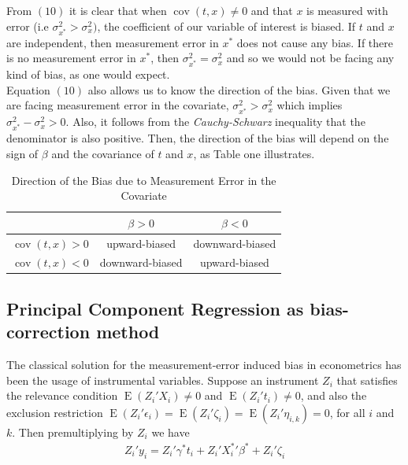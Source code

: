 \documentclass[10pt]{article}
\def\b{\beta}
\begin{document}
       From $(10)$ it is clear that when $\operatorname{cov}(t,x)\neq 0$ and that $x$ is measured with error (i.e $\sigma_{x^*}^2>\sigma_x^2)$, the coefficient of our variable of interest is biased. If $t$ and $x$ are independent, then measurement error in $x^*$ does not cause any bias. If there is no measurement error in $x^*$, then $\sigma^2_{x^*}=\sigma^2_x$ and so we would not be facing any kind of bias, as one would expect.\\
        
        Equation $(10)$ also allows us to know the direction of the bias. Given that we are facing measurement error in the covariate, $\sigma^2_{x^*}>\sigma^2_x$ which implies $\sigma^2_{x^*}-\sigma^2_x>0$. Also, it follows from the \textit{Cauchy-Schwarz} inequality that the denominator is also positive. Then, the direction of the bias will depend on the sign of $\beta$ and the covariance of $t$ and $x$, as Table one illustrates.
        
        \begin{table}[h!]
            \centering
            \begin{tabular}{|c|c|c|}\hline \hline
              & $\b>0$  & $\b<0$ \\ \hline
             $\operatorname{cov}(t,x)>0$ & upward-biased & downward-biased \\ \hline
             $\operatorname{cov}(t,x)<0$ & downward-biased & upward-biased \\ \hline
            \end{tabular} 
            \caption{Direction of the Bias due to Measurement Error in the Covariate}
            \label{tab:my_label}
        \end{table}
        
         
        \subsection*{Principal Component Regression as bias-correction method}
        
        The classical solution for the measurement-error induced bias in econometrics has been the usage of instrumental variables. Suppose an instrument $Z_i$ that satisfies the relevance condition $\operatorname{E}(Z_i'X_i)\neq 0$ and $\operatorname{E}(Z_i't_i)\neq 0$, and also the exclusion restriction $\operatorname{E}(Z_i'\epsilon_i)=\operatorname{E}(Z_i'\zeta_i)=\operatorname{E}(Z_i'\eta_{i,k})=0$, for all $i$ and $k$. Then premultiplying by $Z_i$ we have
        \begin{align}
            Z_i'y_i =  Z_i'\gamma^* t_i +  Z_i'{X^{*}_i}' \beta^* +  Z_i'\zeta_i
        \end{align}
        
\end{document}
